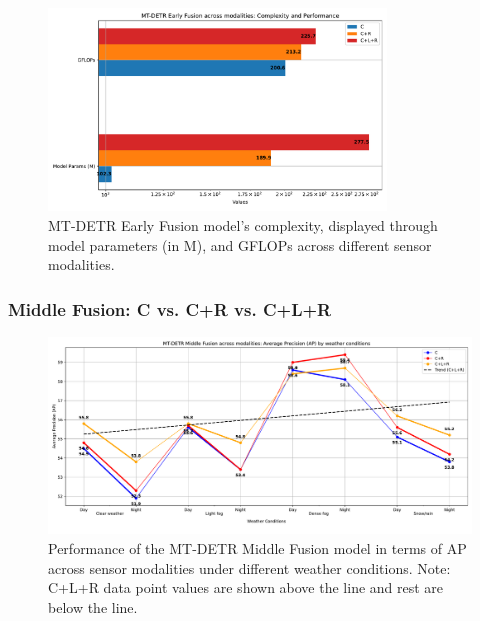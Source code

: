 \documentclass[report.tex]{subfiles}
\begin{document}
        \begin{figure}[]
            \centering
            \includegraphics[width=0.8\textwidth]{images/results/mtdetr/early/model_complexity.pdf}
            \caption{MT-DETR Early Fusion model's complexity, displayed through model parameters (in M), and GFLOPs across different sensor modalities.}
            \label{fig:mtdetr_early_model_complexity}
        \end{figure}

    \FloatBarrier
    \subsubsection{Middle Fusion: C vs. C+R vs. C+L+R}

    \begin{figure}[h!]
        \centering
        \includegraphics[width=1.0\textwidth]{images/results/mtdetr/middle/ap.pdf}
        \caption{Performance of the MT-DETR Middle Fusion model in terms of AP across sensor modalities under different weather conditions. Note: C+L+R data point values are shown above the line and rest are below the line.}
        \label{fig:mtdetr_middle_ap}
    \end{figure}
\end{document}
